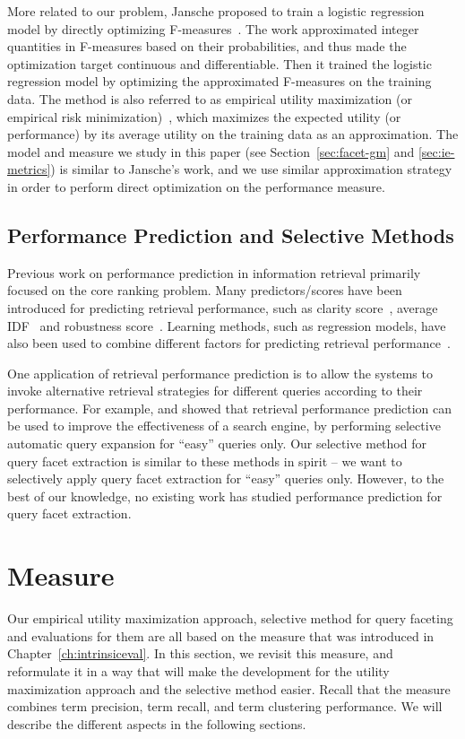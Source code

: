 More related to our problem, Jansche proposed to train a logistic regression model by directly optimizing F-measures~\cite{jansche2005maximum}. The work approximated integer quantities in F-measures based on their probabilities, and thus made the optimization target continuous and differentiable. Then it trained the logistic regression model by optimizing the approximated F-measures on the training data. The method is also referred to as empirical utility maximization (or empirical risk minimization)~\cite{ye2012optimizing}, which maximizes the expected utility (or performance) by its average utility on the training data as an approximation. The model and measure we study in this paper (see Section~\ref{sec:facet-gm} and \ref{sec:ie-metrics}) is similar to Jansche's work, and we use similar approximation strategy in order to perform direct optimization on the performance measure.

\subsection{Performance Prediction and Selective Methods}
Previous work on performance prediction in information retrieval primarily focused on the core ranking problem. Many predictors/scores have been introduced for predicting retrieval performance, such as clarity score~\cite{cronen2002predicting}, average IDF~\cite{tomlinson2004robust} and robustness score~\cite{zhou2006ranking}. Learning methods, such as regression models, have also been used to combine different factors for predicting retrieval performance~\cite{kwok2004trec,balasubramanian2010predicting,yom2005learning}. 

One application of retrieval performance prediction is to allow the systems to invoke alternative retrieval strategies for different queries according to their performance. For example, \citet{yom2005learning} and \citet{amati2004query} showed that retrieval performance prediction can be used to improve the effectiveness of a search engine, by performing selective
automatic query expansion for ``easy'' queries only. Our selective method for query facet extraction is similar to these methods in spirit -- we want to selectively apply query facet extraction for ``easy'' queries only. However, to the best of our knowledge, no existing work has studied performance prediction for query facet extraction.

\section{\PRF Measure}
\label{sec:precision-measure}
Our empirical utility maximization approach, selective method for query faceting and evaluations for them are all based on the \PRF measure that was introduced in Chapter~\ref{ch:intrinsiceval}. In this section, we revisit this measure, and reformulate it in a way that will make the development for the utility maximization approach and the selective method easier. Recall that the \PRF measure combines term precision, term recall, and term clustering performance. We will describe the different aspects in the following sections.

